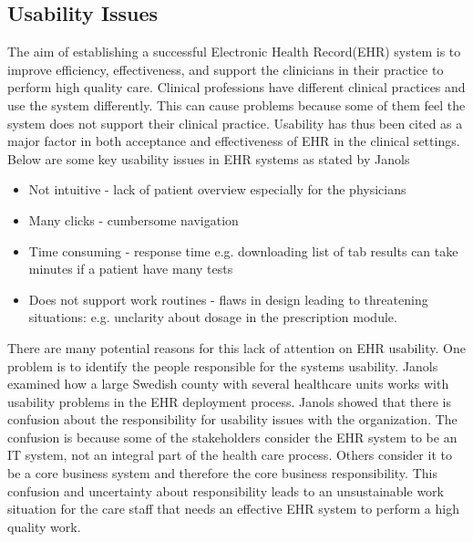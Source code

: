 \documentclass[14pt]{article}
\begin{document}
\subsection{Usability Issues}
\label{sec:futureUsability}
The aim of establishing a successful Electronic Health Record(EHR) system is to improve efficiency, effectiveness, and support the clinicians in their practice to perform high quality care. Clinical professions have different clinical practices and use the system differently. This can cause problems because some of them feel the system does not support their clinical practice. Usability has thus been cited as a major factor in both acceptance and effectiveness of EHR in the clinical settings. Below are some key usability issues in EHR systems as stated by Janols\cite{Janols}  
\begin{itemize}
\item Not intuitive - lack of patient overview especially for the physicians
\item Many clicks - cumbersome navigation
\item Time consuming - response time e.g. downloading list of tab results can take minutes if a patient have many tests
\item Does not support work routines - flaws in design leading to threatening situations:  e.g. unclarity about dosage in the  prescription module.
\end{itemize}

There are many potential reasons for this lack of attention on EHR usability. One problem is to identify the people responsible for the systems usability. Janols \cite{Janols} examined how a large Swedish county with several healthcare units works with usability problems in the EHR deployment process. Janols \cite{Janols} showed that there is confusion about the responsibility for usability issues with the organization. The confusion is because some of the stakeholders consider the EHR system to be an IT system, not an integral part of the health care process. Others consider it to be a core business system and therefore the core business responsibility. This confusion and uncertainty about responsibility leads to an unsustainable work situation for the care staff that needs an effective EHR system to perform a high quality work.
\end{document}
